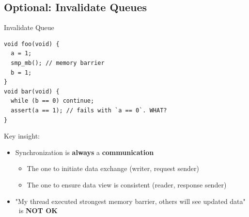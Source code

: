 \subsection{Optional: Invalidate Queues}
\showTOCSub

\begin{frame}[fragile]{Invalidate Queue}


\begin{verbatim}
void foo(void) {
  a = 1;
  smp_mb(); // memory barrier
  b = 1;
}
void bar(void) {
  while (b == 0) continue;
  assert(a == 1); // fails with `a == 0`. WHAT?
}
\end{verbatim}

\pause
Key insight:
\begin{itemize}
    \item Synchronization is \textbf{always} a \textbf{communication}
    \begin{itemize}
        \item The one to initiate data exchange (writer, request sender)
        \item The one to ensure data view is consistent (reader, response sender)
    \end{itemize}
    \item "My thread executed strongest memory barrier, others will see updated data" \ is \textbf{NOT OK}
\end{itemize}

\end{frame}


